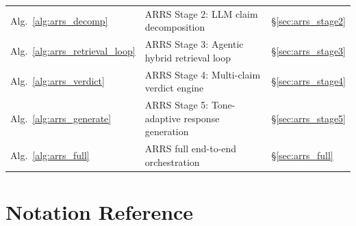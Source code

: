 \documentclass[12pt,a4paper]{article}
\theoremstyle{definition}
\theoremstyle{plain}
\theoremstyle{remark}
\begin{document}
\begin{longtable}{p{4.0cm}p{7.0cm}p{3.2cm}}
Alg.~\ref{alg:arrs_decomp} & ARRS Stage 2: LLM claim decomposition & \S\ref{sec:arrs_stage2} \\[3pt]
Alg.~\ref{alg:arrs_retrieval_loop} & ARRS Stage 3: Agentic hybrid retrieval loop & \S\ref{sec:arrs_stage3} \\[3pt]
Alg.~\ref{alg:arrs_verdict} & ARRS Stage 4: Multi-claim verdict engine & \S\ref{sec:arrs_stage4} \\[3pt]
Alg.~\ref{alg:arrs_generate} & ARRS Stage 5: Tone-adaptive response generation & \S\ref{sec:arrs_stage5} \\[3pt]
Alg.~\ref{alg:arrs_full} & ARRS full end-to-end orchestration & \S\ref{sec:arrs_full} \\[3pt]
\end{longtable}

\section{Notation Reference}
\end{document}
